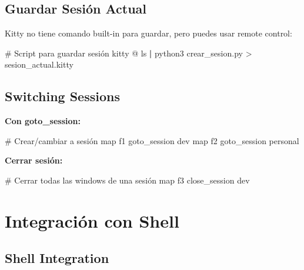 \documentclass[
  doc,
  floatsintext,
  longtable,
  a4paper,
  nolmodern,
  notxfonts,
  notimes,
  12pt,
  colorlinks=true,linkcolor=blue,citecolor=blue,urlcolor=blue]{apa7}
\newenvironment{Shaded}{\begin{snugshade}}{\end{snugshade}}
\newcommand{\CommentTok}[1]{\textcolor[rgb]{0.37,0.37,0.37}{#1}}
\newcommand{\DataTypeTok}[1]{\textcolor[rgb]{0.68,0.00,0.00}{#1}}
\newcommand{\ExtensionTok}[1]{\textcolor[rgb]{0.00,0.23,0.31}{#1}}
\newcommand{\KeywordTok}[1]{\textcolor[rgb]{0.00,0.23,0.31}{\textbf{#1}}}
\newcommand{\NormalTok}[1]{\textcolor[rgb]{0.00,0.23,0.31}{#1}}
\newcommand{\OperatorTok}[1]{\textcolor[rgb]{0.37,0.37,0.37}{#1}}
\begin{document}
\subsection{Guardar Sesión Actual}\label{guardar-sesiuxf3n-actual}

Kitty no tiene comando built-in para guardar, pero puedes usar remote
control:

\begin{Shaded}
\begin{Highlighting}[]
\CommentTok{\# Script para guardar sesión}
\ExtensionTok{kitty}\NormalTok{ @ ls }\KeywordTok{|} \ExtensionTok{python3}\NormalTok{ crear\_sesion.py }\OperatorTok{\textgreater{}}\NormalTok{ sesion\_actual.kitty}
\end{Highlighting}
\end{Shaded}

\subsection{Switching Sessions}\label{switching-sessions}

\textbf{Con goto\_session:}

\begin{Shaded}
\begin{Highlighting}[]
\CommentTok{\# Crear/cambiar a sesión}
\DataTypeTok{map} \DataTypeTok{f1} \DataTypeTok{goto\_session} \DataTypeTok{dev}
\DataTypeTok{map} \DataTypeTok{f2} \DataTypeTok{goto\_session} \DataTypeTok{personal}
\end{Highlighting}
\end{Shaded}

\textbf{Cerrar sesión:}

\begin{Shaded}
\begin{Highlighting}[]
\CommentTok{\# Cerrar todas las windows de una sesión}
\DataTypeTok{map} \DataTypeTok{f3} \DataTypeTok{close\_session} \DataTypeTok{dev}
\end{Highlighting}
\end{Shaded}

\section{Integración con Shell}\label{integraciuxf3n-con-shell}

\subsection{Shell Integration}\label{shell-integration}
\end{document}

